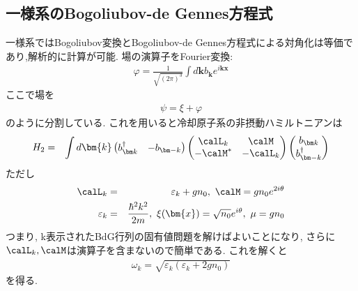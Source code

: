 \documentclass[10.5pt,a4paper]{jreport}
\begin{document}
\subsection{一様系のBogoliubov-de Gennes方程式}
一様系ではBogoliubov変換とBogoliubov-de Gennes方程式による対角化は等価であり,解析的に計算が可能. 場の演算子をFourier変換:
\begin{eqnarray}
  \varphi = \frac{1}{\sqrt{(2\pi)^3}}\int d\bm{k} b_{\bm k}e^{i\bm{kx}}
\end{eqnarray}
ここで場を
\begin{eqnarray}
  \psi = \xi + \varphi
\end{eqnarray}
のように分割している. これを用いると冷却原子系の非摂動ハミルトニアンは
\begin{eqnarray}
  H_2 &=& \int d\bm{k}
  \begin{pmatrix}
    b_{\bm k}^\dagger &-b_{\bm -k} 
  \end{pmatrix}
  \begin{pmatrix}
    \calL_k &\calM\\
    -\calM^* &-\calL_k
  \end{pmatrix}
  \begin{pmatrix}
    b_{\bm k}\\
    b_{\bm -k}^\dagger 
  \end{pmatrix}
\end{eqnarray}
ただし
\begin{eqnarray}
  \calL_k &=& \varepsilon_k + gn_0,\ \calM = gn_0e^{2i\theta}\\
  \varepsilon_k &=& \frac{\hbar^2k^2}{2m},\ \xi(\bm{x}) = \sqrt{n_0}e^{i\theta},\ \mu = gn_0
\end{eqnarray}
つまり, k表示されたBdG行列の固有値問題を解けばよいことになり, さらに$\calL_k, \calM$は演算子を含まないので簡単である. これを解くと
\begin{eqnarray}
  \omega_k = \sqrt{\varepsilon_k(\varepsilon_k + 2gn_0)}
\end{eqnarray}
を得る.
\end{document}
